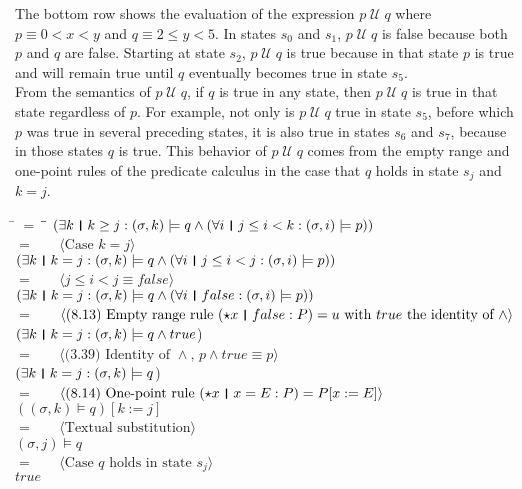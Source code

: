 \documentclass[fleqn, leqno]{article}
\newcommand{\lgap}{2pt}                             %
\newcommand{\mymathindent}{24pt}                    %
\newcommand{\Until}{\;\mathcal{U}\;}
\newcommand{\myqedtab}{\hspace{388.5pt}}              %
\newcommand{\thedr}{\rule[-.25ex]{.32mm}{1.75ex}}   %
\newcommand{\dr}{\;\,\thedr\,\;}                    %
\newcommand{\rb}{:}                                 %
\newcommand{\all}{\forall}                          %
\newcommand{\ext}{\exists}                          %
\newcommand{\Gll} {\langle}                         %
\newcommand{\Ggg} {\rangle}                         %
\newcommand{\Hint}[1]     {\ \ \ $\Gll              \mbox{#1} \Ggg$ }   %
\begin{document}
The bottom row shows the evaluation of the expression $p\Until q$ where $p\equiv 0<x<y$ and $q\equiv 2\le y<5$.
In states $s_0$ and $s_1$, $p\Until q$ is false because both $p$ and $q$ are false.
Starting at state $s_2$, $p\Until q$ is true because in that state $p$ is true and will remain true until $q$
eventually becomes true in state $s_5$.\\

From the semantics of $p\Until q$, if $q$ is true in any state, then $p\Until q$ is true in that state regardless of $p$.
For example, not only is $p\Until q$ true in state $s_5$, before which $p$ was true in several preceding states,
it is also true in states $s_6$ and $s_7$, because in those states $q$ is true.
This behavior of $p\Until q$ comes from the empty range and one-point rules \cite{LADM} of the predicate calculus in the case that
$q$ holds in state $s_j$ and $k=j$.

\begin{tabbing}
\hspace{\mymathindent} \= $= \;$ \= \myqedtab \= \kill
	\> \>   $(\ext k \dr k \ge j \rb (\sigma,k) \models q \land (\all i \dr j\le i < k \rb (\sigma,i) \models p))$\\[\lgap]
	\> $=$  \>  \Hint{Case $k=j$}\\[\lgap]
	\> \>   $(\ext k \dr k=j \rb (\sigma,k) \models q \land (\all i \dr j\le i < j \rb (\sigma,i) \models p))$\\[\lgap]
	\> $=$  \>  \Hint{$j\le i < j \equiv false$}\\[\lgap]
	\> \>   $(\ext k \dr k=j \rb (\sigma,k) \models q \land (\all i \dr false \rb (\sigma,i) \models p))$\\[\lgap]
	\> $=$  \>  \Hint{(8.13) Empty range rule $(\star x \dr false \rb P) =u$ with $true$ the identity of $\land$}\\[\lgap]
	\> \>   $(\ext k \dr k=j \rb (\sigma,k) \models q \land true$)\\[\lgap]
	\> $=$  \>  \Hint{(3.39) Identity of $\land$, $p \land true \equiv p$}\\[\lgap]
	\> \>   $(\ext k \dr k=j \rb (\sigma,k) \models q$)\\[\lgap]
	\> $=$  \>  \Hint{(8.14) One-point rule $(\star x\dr x=E\rb P) = P[x:=E]$}\\[\lgap]
	\> \>   $((\sigma,k) \models q)[k := j]$\\[\lgap]
	\> $=$  \>  \Hint{Textual substitution}\\[\lgap]
	\> \>   $(\sigma,j) \models q$\\[\lgap]
	\> $=$  \>  \Hint{Case $q$ holds in state $s_j$}\\[\lgap]
	\> \>   $true$
\end{tabbing}
\end{document}
